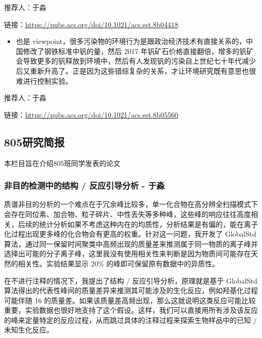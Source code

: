 \documentclass[
]{book}
\providecommand{\tightlist}{%
  \setlength{\itemsep}{0pt}\setlength{\parskip}{0pt}}
\begin{document}
推荐人：于淼

链接：\url{https://pubs.acs.org/doi/10.1021/acs.est.8b04418}

\begin{itemize}
\tightlist
\item
  也是 viewpoint，很多污染物的环境行为是跟政治经济技术有直接关系的，中国修改了钢铁标准中钒的量，然后 2017 年钒矿石价格直接翻倍，增多的钒矿会导致更多的钒释放到环境中，然后有人发现钒的污染自上世纪七十年代减少后又重新升高了。正是因为这些错综复杂的关系，才让环境研究既有意思也很难进行控制实验。
\end{itemize}

推荐人：于淼

链接：\url{https://pubs.acs.org/doi/10.1021/acs.est.8b05560}

\hypertarget{ux7814ux7a76ux7b80ux62a5-2}{%
\subsection*{805研究简报}\label{ux7814ux7a76ux7b80ux62a5-2}}

本栏目旨在介绍805班同学发表的论文

\hypertarget{ux975eux76eeux7684ux68c0ux6d4bux4e2dux7684ux7ed3ux6784-ux53cdux5e94ux5f15ux5bfcux5206ux6790---ux4e8eux6dfc}{%
\subsubsection*{非目的检测中的结构 / 反应引导分析 - 于淼}\label{ux975eux76eeux7684ux68c0ux6d4bux4e2dux7684ux7ed3ux6784-ux53cdux5e94ux5f15ux5bfcux5206ux6790---ux4e8eux6dfc}}

质谱非目的分析的一个难点在于冗余峰比较多，单一化合物在高分辨全扫描模式下会存在同位素、加合物、粒子碎片、中性丢失等多种峰，这些峰的响应往往高度相关，后续的统计分析如果不考虑这种内在的均质性，分析结果是有偏的，能在离子化过程出现更多峰的化合物会有更高的权重。针对这一问题，我开发了 GlobalStd 算法，通过同一保留时间聚类中高频出现的质量差来推测属于同一物质的离子峰并选择出可能的分子离子峰，这里我没有使用相关性来判断是因为物质间可能存在天然的相关性。实验结果显示 20\% 的峰即可保留原有数据中的异质性。

在不进行注释的情况下，我提出了结构 / 反应引导分析，原理就是基于 GlobalStd 算法得出的代表性峰间的质量差异来推测其可能涉及的生化反应，例如羟基化过程可能伴随 16 的质量差。如果该质量差高频出现，那么这就说明这类反应可能比较重要，实验数据也很好地支持了这个假设。这样，我们可以直接用所有涉及该反应的峰来定量特定的反应过程，从而跳过具体的注释过程来探索生物样品中的已知 / 未知生化反应。
\end{document}
